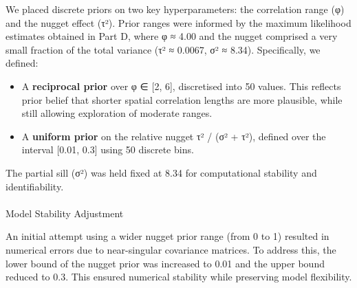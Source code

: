 \documentclass[
  11pt,
]{article}
\makeatletter
\let\oldparagraph\paragraph
\renewcommand{\paragraph}{
    \@ifstar
      \xxxParagraphStar
      \xxxParagraphNoStar
  }
\newcommand{\xxxParagraphStar}[1]{\oldparagraph*{#1}\mbox{}}
\newcommand{\xxxParagraphNoStar}[1]{\oldparagraph{#1}\mbox{}}
\newenvironment{Shaded}{\begin{snugshade}}{\end{snugshade}}
\newcommand{\AttributeTok}[1]{\textcolor[rgb]{0.40,0.45,0.13}{#1}}
\newcommand{\DecValTok}[1]{\textcolor[rgb]{0.68,0.00,0.00}{#1}}
\newcommand{\FloatTok}[1]{\textcolor[rgb]{0.68,0.00,0.00}{#1}}
\newcommand{\FunctionTok}[1]{\textcolor[rgb]{0.28,0.35,0.67}{#1}}
\newcommand{\NormalTok}[1]{\textcolor[rgb]{0.00,0.23,0.31}{#1}}
\newcommand{\OtherTok}[1]{\textcolor[rgb]{0.00,0.23,0.31}{#1}}
\newcommand{\SpecialCharTok}[1]{\textcolor[rgb]{0.37,0.37,0.37}{#1}}
\newcommand{\StringTok}[1]{\textcolor[rgb]{0.13,0.47,0.30}{#1}}
\providecommand{\tightlist}{%
  \setlength{\itemsep}{0pt}\setlength{\parskip}{0pt}}\usepackage{longtable,booktabs,array}
\makeatother
\begin{document}
We placed discrete priors on two key hyperparameters: the correlation
range (φ) and the nugget effect (τ²). Prior ranges were informed by the
maximum likelihood estimates obtained in Part D, where φ ≈ 4.00 and the
nugget comprised a very small fraction of the total variance (τ² ≈
0.0067, σ² ≈ 8.34). Specifically, we defined:

\begin{itemize}
\tightlist
\item
  A \textbf{reciprocal prior} over φ ∈ {[}2, 6{]}, discretised into 50
  values. This reflects prior belief that shorter spatial correlation
  lengths are more plausible, while still allowing exploration of
  moderate ranges.
\item
  A \textbf{uniform prior} on the relative nugget τ² / (σ² + τ²),
  defined over the interval {[}0.01, 0.3{]} using 50 discrete bins.
\end{itemize}

The partial sill (σ²) was held fixed at 8.34 for computational stability
and identifiability.

\paragraph{Model Stability Adjustment}\label{model-stability-adjustment}

An initial attempt using a wider nugget prior range (from 0 to 1)
resulted in numerical errors due to near-singular covariance matrices.
To address this, the lower bound of the nugget prior was increased to
0.01 and the upper bound reduced to 0.3. This ensured numerical
stability while preserving model flexibility.

\begin{Shaded}
\end{Shaded}
\end{document}

